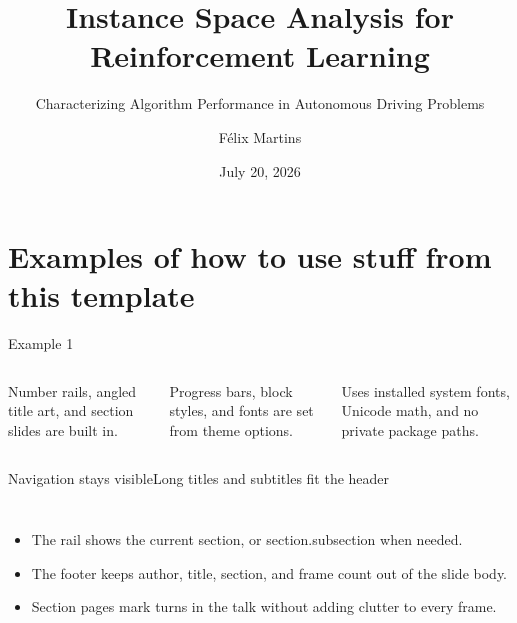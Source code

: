 \documentclass[aspectratio=169]{beamer}
\title[ISA4RL]{Instance Space Analysis for Reinforcement Learning}
\subtitle{Characterizing Algorithm Performance in Autonomous Driving Problems}
\author[F\'elix]{F\'elix Martins}
\date{July 20, 2026}
\begin{document}
\maketitle

\section{Examples of how to use stuff from this template}

\begin{frame}{Example 1}
  \begin{columns}[T,onlytextwidth]
      \vspace{.55em}

      Number rails, angled title art, and section slides are built in.

      \vspace{.55em}

      Progress bars, block styles, and fonts are set from theme options.

      \vspace{.55em}

      Uses installed system fonts, Unicode math, and no private package paths.
  \end{columns}

  \vfill
   \hspace{.35em}
   \hspace{.35em}
\end{frame}

\begin{frame}{Navigation stays visible}{Long titles and subtitles fit the header}
  \begin{columns}[T,onlytextwidth]
      \begin{itemize}
        \item The rail shows the current section, or section.subsection when needed.
        \item The footer keeps author, title, section, and frame count out of the slide body.
        \item Section pages mark turns in the talk without adding clutter to every frame.
      \end{itemize}

  \end{columns}
\end{frame}
\end{document}
